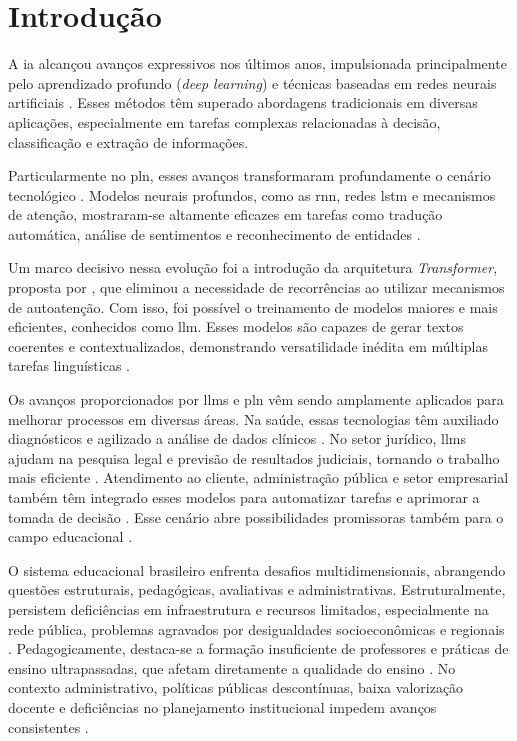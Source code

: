 \chapter{Introdução}
\label{cap:introducao}

A \gls{ia} alcançou avanços expressivos nos últimos anos, impulsionada principalmente pelo aprendizado profundo (\textit{deep learning}) e técnicas baseadas em redes neurais artificiais \cite{young_recent_2018, otter_survey_2021}. Esses métodos têm superado abordagens tradicionais em diversas aplicações, especialmente em tarefas complexas relacionadas à decisão, classificação e extração de informações.

Particularmente no \gls{pln}, esses avanços transformaram profundamente o cenário tecnológico \cite{torfi_natural_2021}. Modelos neurais profundos, como as \gls{rnn}, redes \gls{lstm} e mecanismos de atenção, mostraram-se altamente eficazes em tarefas como tradução automática, análise de sentimentos e reconhecimento de entidades \cite{young_recent_2018, otter_survey_2021}.

Um marco decisivo nessa evolução foi a introdução da arquitetura \textit{Transformer}, proposta por , que eliminou a necessidade de recorrências ao utilizar mecanismos de autoatenção. Com isso, foi possível o treinamento de modelos maiores e mais eficientes, conhecidos como \gls{llm}. Esses modelos são capazes de gerar textos coerentes e contextualizados, demonstrando versatilidade inédita em múltiplas tarefas linguísticas \cite{chen_evaluating_2021}.

Os avanços proporcionados por \gls{llm}s e \gls{pln} vêm sendo amplamente aplicados para melhorar processos em diversas áreas. Na saúde, essas tecnologias têm auxiliado diagnósticos e agilizado a análise de dados clínicos \cite{paixao_machine_2022}. No setor jurídico, \gls{llm}s ajudam na pesquisa legal e previsão de resultados judiciais, tornando o trabalho mais eficiente \cite{lai_large_2024}. Atendimento ao cliente, administração pública e setor empresarial também têm integrado esses modelos para automatizar tarefas e aprimorar a tomada de decisão \cite{pessanha_large_2024}. Esse cenário abre possibilidades promissoras também para o campo educacional \cite{shahzad_comprehensive_2025}.


O sistema educacional brasileiro enfrenta desafios multidimensionais, abrangendo questões estruturais, pedagógicas, avaliativas e administrativas. Estruturalmente, persistem deficiências em infraestrutura e recursos limitados, especialmente na rede pública, problemas agravados por desigualdades socioeconômicas e regionais \cite{carnaval_desigualdade_2021}. Pedagogicamente, destaca-se a formação insuficiente de professores e práticas de ensino ultrapassadas, que afetam diretamente a qualidade do ensino \cite{gatti_formacao_2017}. No contexto administrativo, políticas públicas descontínuas, baixa valorização docente e deficiências no planejamento institucional impedem avanços consistentes \cite{silva_politicas_2020}.

